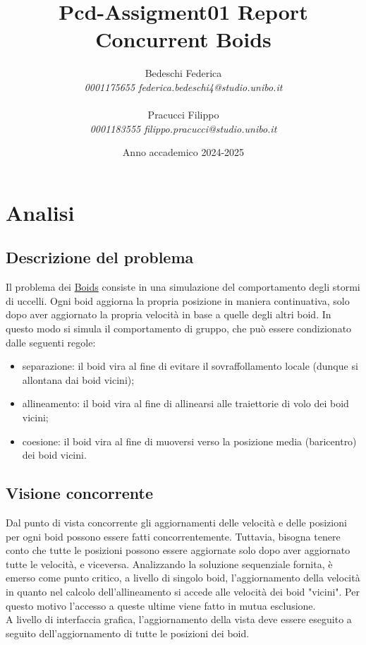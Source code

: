 \documentclass[a4paper,12pt]{report}
\title{\textbf{Pcd-Assigment01 Report}\\\large Concurrent Boids}
\author{
Bedeschi Federica \\
\textit{0001175655 federica.bedeschi4@studio.unibo.it}\\\\
Pracucci Filippo \\
\textit{0001183555 filippo.pracucci@studio.unibo.it}
}
\date{Anno accademico 2024-2025}
\begin{document}
\maketitle
\newpage

\tableofcontents

\chapter{Analisi}
\section{Descrizione del problema}
Il problema dei \href{https://en.wikipedia.org/wiki/Boids}{Boids} consiste in una simulazione del comportamento degli stormi di uccelli.
Ogni boid aggiorna la propria posizione in maniera continuativa, solo dopo aver aggiornato la propria velocità in base a quelle degli altri boid. In questo modo si simula il comportamento di gruppo, che può essere condizionato dalle seguenti regole:
\begin{itemize}
    \item separazione: il boid vira al fine di evitare il sovraffollamento locale (dunque si allontana dai boid vicini);
    \item allineamento: il boid vira al fine di allinearsi alle traiettorie di volo dei boid vicini;
    \item coesione: il boid vira al fine di muoversi verso la posizione media (baricentro) dei boid vicini.
\end{itemize}
\section{Visione concorrente}
Dal punto di vista concorrente gli aggiornamenti delle velocità e delle posizioni per ogni boid possono essere fatti concorrentemente. Tuttavia, bisogna tenere conto che tutte le posizioni possono essere aggiornate solo dopo aver aggiornato tutte le velocità, e viceversa.
Analizzando la soluzione sequenziale fornita, è emerso come punto critico, a livello di singolo boid, l'aggiornamento della velocità in quanto nel calcolo dell'allineamento si accede alle velocità dei boid "vicini". Per questo motivo l'accesso a queste ultime viene fatto in mutua esclusione.\\
A livello di interfaccia grafica, l'aggiornamento della vista deve essere eseguito a seguito dell'aggiornamento di tutte le posizioni dei boid.
\end{document}
